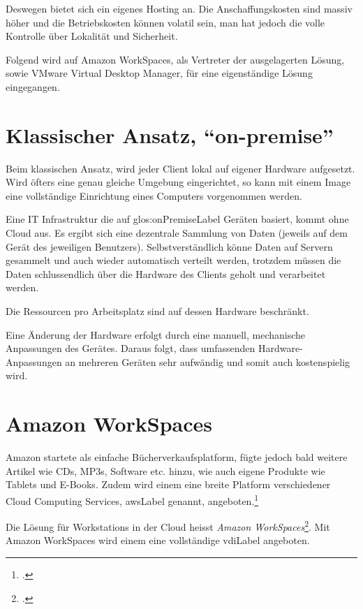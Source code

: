Deswegen bietet sich ein eigenes Hosting an. Die Anschaffungskosten sind massiv höher und die Betriebskosten können volatil sein, man hat jedoch die volle Kontrolle über Lokalität und Sicherheit.

Folgend wird auf Amazon WorkSpaces, als Vertreter der ausgelagerten Lösung, sowie VMware Virtual Desktop Manager, für eine eigenständige Lösung eingegangen.

\section{Klassischer Ansatz, "`on-premise"'}
Beim klassischen Ansatz, wird jeder Client lokal auf eigener Hardware aufgesetzt. Wird öfters eine genau gleiche Umgebung eingerichtet, so kann mit einem Image eine vollständige Einrichtung eines Computers vorgenommen werden.

Eine IT Infrastruktur die auf \gls{glos:onPremiseLabel} Geräten basiert, kommt ohne Cloud aus. Es ergibt sich eine dezentrale Sammlung von Daten (jeweils auf dem Gerät des jeweiligen Benutzers). Selbstverständlich könne Daten auf Servern gesammelt und auch wieder automatisch verteilt werden, trotzdem müssen die Daten schlussendlich über die Hardware des Clients geholt und verarbeitet werden.

Die Ressourcen pro Arbeitsplatz sind auf dessen Hardware beschränkt.

Eine Änderung der Hardware erfolgt durch eine manuell, mechanische Anpassungen des Gerätes.
Daraus folgt, dass umfassenden Hardware-Anpassungen an mehreren Geräten sehr aufwändig und somit auch kostenspielig wird.

\newpage
\section{Amazon WorkSpaces}

Amazon startete als einfache Bücherverkaufsplatform, fügte jedoch bald weitere Artikel wie CDs, MP3s, Software etc. hinzu, wie auch eigene Produkte wie Tablets und E-Books.
Zudem wird einem eine breite Platform verschiedener Cloud Computing Services, \Gls{awsLabel} genannt, angeboten.\footcite{Amazon.com_-_Wikipedia_the_free_encyclopedia_2014-11-15}

Die Lösung für Workstations in der Cloud heisst \textit{Amazon WorkSpaces}\footcite{AWS_Amazon_WorkSpaces_2014-11-03}.
Mit Amazon WorkSpaces wird einem eine vollständige \Gls{vdiLabel} angeboten.


